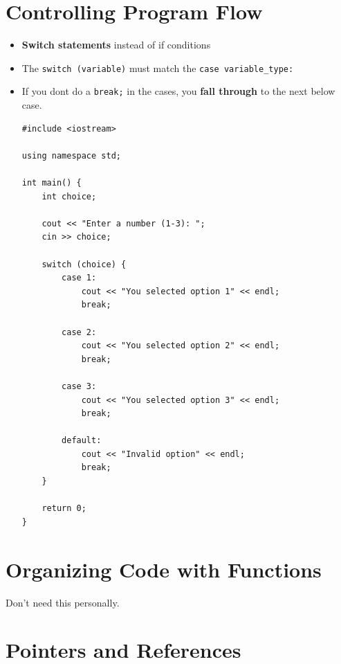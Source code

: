 \documentclass[10pt]{article}
\newcommand{\newbp}{%
  \newpage
  \mbox{}
  \newpage
}
\begin{document}
\newbp
\section{Controlling Program Flow}
\begin{itemize}
	\item \textbf{Switch statements} instead of if conditions
	\item The \verb|switch (variable)| must match the \verb|case variable_type:|
	\item If you dont do a \verb|break;| in the cases, you \textbf{fall through} to the next below case.
\begin{verbatim}
#include <iostream>

using namespace std;

int main() {
    int choice;

    cout << "Enter a number (1-3): ";
    cin >> choice;

    switch (choice) {
        case 1:
            cout << "You selected option 1" << endl;
            break;

        case 2:
            cout << "You selected option 2" << endl;
            break;

        case 3:
            cout << "You selected option 3" << endl;
            break;

        default:
            cout << "Invalid option" << endl;
            break;
    }

    return 0;
}
\end{verbatim}
\end{itemize}

\newpage
\section{Organizing Code with Functions}
Don't need this personally.

\newbp
\section{Pointers and References}
\end{document}
